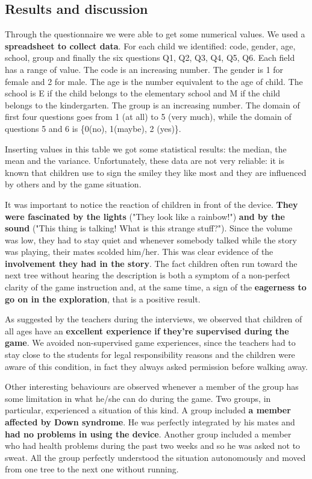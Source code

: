 \documentclass[a4paper,11pt]{report}
\begin{document}
\subsection{Results and discussion}
Through the questionnaire we were able to get some numerical values. We used a \textbf{spreadsheet to collect data}. For each child we identified: code, gender, age, school, group and finally the six questions Q1, Q2, Q3, Q4, Q5, Q6. Each field has a range of value. The code is an increasing number. The gender is 1 for female and 2 for male. The age is the number equivalent to the age of child. The school is E if the child belongs to the elementary school and M if the child belongs to the kindergarten. The group is an increasing number. The domain of first four questions goes from 1 (at all) to 5 (very much), while the domain of questions 5 and 6 is \{0(no), 1(maybe), 2 (yes)\}.\par
Inserting values in this table we got some statistical results: the median, the mean and the variance. Unfortunately, these data are not very reliable: it is known that children use to sign the smiley they like most and they are influenced by others and by the game situation.\par 
It was important to notice the reaction of children in front of the device. \textbf{They were fascinated by the lights} ("They look like a rainbow!") \textbf{and by the sound} ("This thing is talking! What is this strange stuff?"). Since the volume was low, they had to stay quiet and whenever somebody talked while the story was playing, their mates scolded him/her. This was clear evidence of the \textbf{involvement they had in the story}. The fact children often run toward the next tree without hearing the description is both a symptom of a non-perfect clarity of the game instruction and, at the same time, a sign of the \textbf{eagerness to go on in the exploration}, that is a positive result.\par
As suggested by the teachers during the interviews, we observed that children of all ages have an \textbf{excellent experience if they’re supervised during the game}. We avoided non-supervised game experiences, since the teachers had to stay close to the students for legal responsibility reasons and the children were aware of this condition, in fact they always asked permission before walking away.\par
Other interesting behaviours are observed whenever a member of the group has some limitation in what he/she can do during the game. Two groups, in particular, experienced a situation of this kind. A group included \textbf{a member affected by Down syndrome}. He was perfectly integrated by his mates and \textbf{had no problems in using the device}. Another group included a member who had health problems during the past two weeks and so he was asked not to sweat. All the group perfectly understood the situation autonomously and moved from one tree to the next one without running.\par
\end{document}
